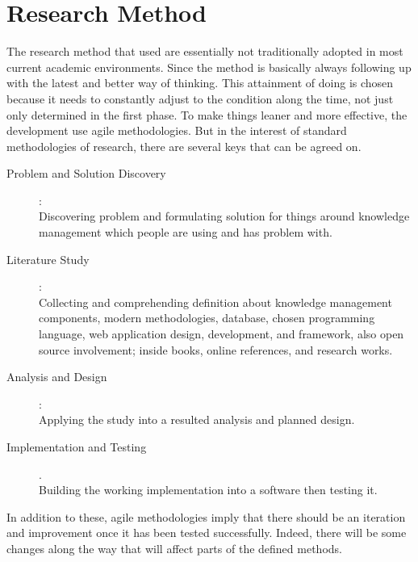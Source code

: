 \section{Research Method}
\label{sec:research-method}

The research method that used are essentially not traditionally adopted in most current academic environments.
Since the method is basically always following up with the latest and better way of thinking.
This attainment of doing is chosen because it needs to constantly adjust to the condition along the time, not just only determined in the first phase.
To make things leaner and more effective, the development use agile methodologies.
But in the interest of standard methodologies of research, there are several keys that can be agreed on.

\begin{description}
\item [Problem and Solution Discovery]: \hfill \\
Discovering problem and formulating solution for things around knowledge management which people are using and has problem with.
\item [Literature Study]: \hfill \\
Collecting and comprehending definition about knowledge management components, modern methodologies, database, chosen programming language, web application design, development, and framework, also open source involvement; inside books, online references, and research works.
\item [Analysis and Design]: \hfill \\
Applying the study into a resulted analysis and planned design.
\item [Implementation and Testing]. \hfill \\
Building the working implementation into a software then testing it.
\end{description}

In addition to these, agile methodologies imply that there should be an iteration and improvement once it has been tested successfully.
Indeed, there will be some changes along the way that will affect parts of the defined methods.
